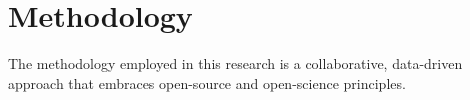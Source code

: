 \documentclass{IEEEtran}
\begin{document}






\section{Methodology}

The methodology employed in this research is a collaborative, data-driven approach that embraces open-source and open-science principles.
\end{document}
